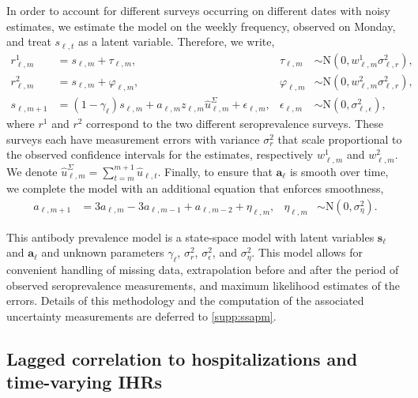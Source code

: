 In order to account for different surveys occurring on different dates with
noisy estimates, we estimate the model on the weekly frequency, observed on
Monday, and treat $s_{\ell,t}$ as a latent variable. Therefore, we write,
\begin{align}
\label{eq:waningpr}
r^1_{\ell,m} &= s_{\ell,m} + \tau_{\ell,m}, 
  & \tau_{\ell,m} &\sim \textrm{N}(0, w^1_{\ell,m}\sigma^2_{\ell,r}),\\
r^2_{\ell,m} &= s_{\ell,m} + \varphi_{\ell,m}, 
  & \varphi_{\ell,m} &\sim \textrm{N}(0, w^2_{\ell,m}\sigma^2_{\ell,r}),\\
s_{\ell,m+1} &= (1 -\gamma_{\ell}) s_{\ell,m} + 
  a_{\ell,m} z_{\ell,m} \widehat{u}^\Sigma_{\ell,m} + \epsilon_{\ell,m}, 
  & \epsilon_{\ell,m} &\sim \textrm{N}(0, \sigma^2_{\ell,\epsilon}),
\end{align}
where $r^1$ and $r^2$ correspond to the two different seroprevalence surveys.
These surveys each have measurement errors with variance $\sigma^2_r$ that scale
proportional to the observed confidence intervals for the estimates,
respectively $w^1_{\ell,m}$ and $w^2_{\ell,m}$. We denote
$\widehat{u}^\Sigma_{\ell,m} = \sum_{t=m}^{m+1} \widehat{u}_{\ell,t}$. Finally,
to ensure that $\mathbf{a}_\ell$ is smooth over time, we complete the model with
an additional equation that enforces smoothness,
\begin{align}
a_{\ell,m+1} &= 3a_{\ell,m} - 3a_{\ell,m-1} + a_{\ell,m-2} + \eta_{\ell,m}, 
  &\eta_{\ell,m}  &\sim \textrm{N}(0, \sigma^2_{\eta}).
\end{align}
    
This antibody prevalence model is a state-space model with latent variables
$\mathbf{s}_{\ell}$ and $\mathbf{a}_{\ell}$ and unknown parameters $\gamma_\ell$,
$\sigma^2_r$, $\sigma^2_\epsilon$, and $\sigma^2_\eta$. This model
allows for convenient handling of missing data, extrapolation
before and after the period of observed seroprevalence measurements, and maximum
likelihood estimates of the errors. Details of this
methodology and the computation of the associated uncertainty measurements are
deferred to \autoref{supp:ssapm}.



\subsection{Lagged correlation to hospitalizations and time-varying IHRs} 
\label{sec:ihr-calculations}

